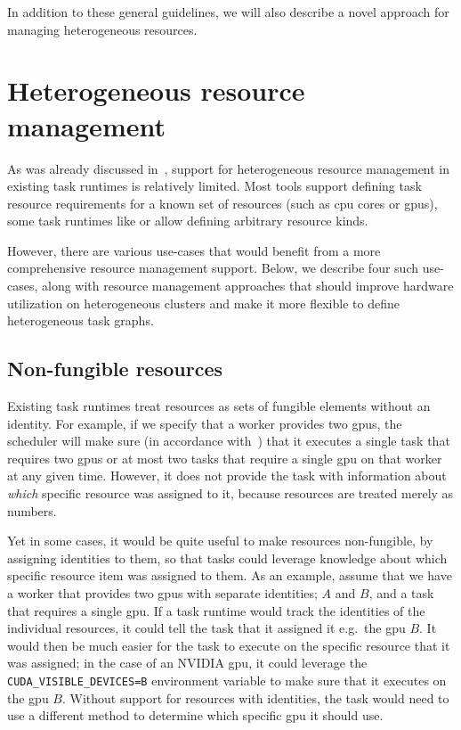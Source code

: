 In addition to these general guidelines, we will also describe a novel approach for managing heterogeneous
resources.

\section{Heterogeneous resource management}
\label{sec:heterogeneous-resources}
As was already discussed in~, support for heterogeneous
resource management in existing task runtimes is relatively limited. Most tools support
defining task resource requirements for a known set of resources (such as \gls{cpu} cores or \glspl{gpu}),
some task runtimes like \dask{} or \snakemake{} allow defining arbitrary resource kinds.

However, there are various use-cases that would benefit from a more comprehensive resource
management support. Below, we describe four such use-cases, along with resource management
approaches that should improve hardware utilization on heterogeneous clusters and make it more
flexible to define heterogeneous task graphs.

\subsection{Non-fungible resources}
Existing task runtimes treat resources as sets of fungible elements without an identity. For
example, if we specify that a \dask{} worker provides two \glspl{gpu}, the \dask{} scheduler will
make sure (in accordance with~) that it executes a single
task that requires two \glspl{gpu} or at most two tasks that require a single \gls{gpu} on that
worker at any given time. However, it does not provide the task with information about \emph{which}
specific resource was assigned to it, because resources are treated merely as numbers.

Yet in some cases, it would be quite useful to make resources non-fungible, by assigning
identities to them, so that tasks could leverage knowledge about which specific resource item was
assigned to them. As an example, assume that we have a worker that provides two \glspl{gpu} with
separate identities; $A$ and $B$, and a task that requires a single \gls{gpu}. If a task runtime
would track the identities of the individual resources, it could tell the task that it assigned
it e.g.\ the \gls{gpu} $B$. It would then be much easier for the task to execute on the specific
resource that it was assigned; in the case of an NVIDIA \gls{gpu}, it could leverage the
\texttt{CUDA\_VISIBLE\_DEVICES=B} environment variable to make sure that it executes on the
\gls{gpu} $B$. Without support for resources with identities, the task would need to use a
different method to determine which specific \gls{gpu} it should use.

